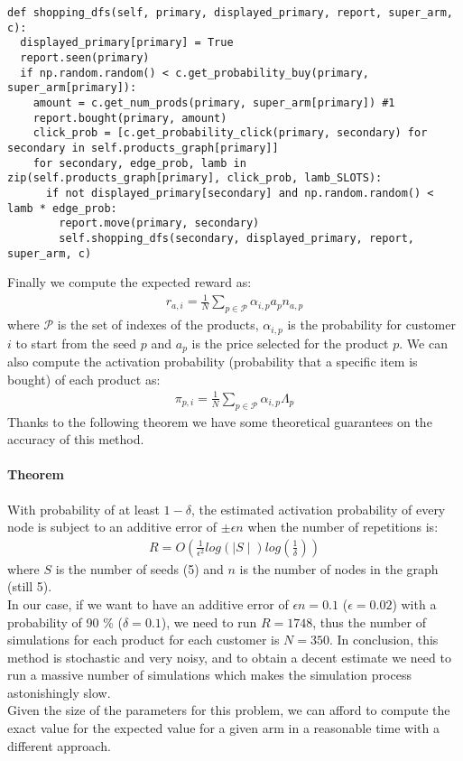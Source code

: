 \begin{verbatim}
def shopping_dfs(self, primary, displayed_primary, report, super_arm, c):
  displayed_primary[primary] = True
  report.seen(primary)
  if np.random.random() < c.get_probability_buy(primary, super_arm[primary]):
    amount = c.get_num_prods(primary, super_arm[primary]) #1
    report.bought(primary, amount)
    click_prob = [c.get_probability_click(primary, secondary) for secondary in self.products_graph[primary]]
    for secondary, edge_prob, lamb in zip(self.products_graph[primary], click_prob, lamb_SLOTS):
      if not displayed_primary[secondary] and np.random.random() < lamb * edge_prob:
        report.move(primary, secondary)
        self.shopping_dfs(secondary, displayed_primary, report, super_arm, c)
\end{verbatim}
 \newpage
Finally we compute the expected reward as:
\begin{align*}
    r_{a, i} = \frac{1}{N}\sum_{p \in \mathcal{P}}\alpha_{i, p} a_{p} n_{a, p}
\end{align*}
where $\mathcal{P}$ is the set of indexes of the products, $\alpha_{i, p}$ is the probability for customer $i$ to start from the seed $p$ and $a_{p}$ is the price selected for the product $p$. We can also compute the activation probability (probability that a specific item is bought) of each product as:
\begin{align*}
    \pi_{p, i} = \frac{1}{N}\sum_{p \in \mathcal{P}}\alpha_{i, p} \Lambda_p
\end{align*}
Thanks to the following theorem we have some theoretical guarantees on the accuracy of this method.
\paragraph{Theorem}
With probability of at least $1 - \delta$, the estimated activation probability of every node is subject to an additive error of $\pm \epsilon n$ when the number of repetitions is:
\begin{align*}
    R = O(\frac{1}{\epsilon^2}log(\mid S \mid)log(\frac{1}{\delta}))
\end{align*}
where $S$ is the number of seeds (5) and $n$ is the number of nodes in the graph (still 5).\\

In our case, if we want to have an additive error of $\epsilon n = 0.1$ ($\epsilon = 0.02$) with a probability of 90 \% ($\delta=0.1$), we need to run $R=1748$, thus the number of simulations for each product for each customer is $N=350$.
In conclusion, this method is stochastic and very noisy, and to obtain a decent estimate we need to run a massive number of simulations which makes the simulation process astonishingly slow.\\
Given the size of the parameters for this problem, we can afford to compute the exact value for the expected value for a given arm in a reasonable time with a different approach.

